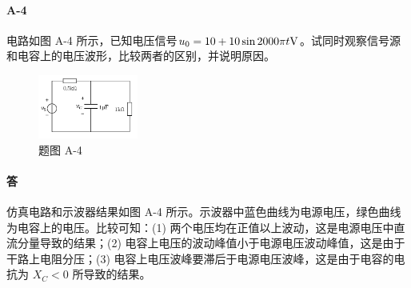 \documentclass[hyperref, UTF8]{ctexart}
\newcommand{\volt}{{\rm V}}
\begin{document}
\paragraph{A-4} 电路如图 A-4 所示，已知电压信号$u_0 = 10 + 10 \sin 2000 \pi t \volt $。试同时观察信号源和电容上的电压波形，比较两者的区别，并说明原因。

\begin{figure}[!htb]
\centering
\includegraphics[width=0.293\textwidth]{pA-4.png}
\caption*{题图 A-4}
\end{figure}

\paragraph{答} 仿真电路和示波器结果如图 A-4 所示。示波器中蓝色曲线为电源电压，绿色曲线为电容上的电压。比较可知：(1) 两个电压均在正值以上波动，这是电源电压中直流分量导致的结果；(2) 电容上电压的波动峰值小于电源电压波动峰值，这是由于干路上电阻分压；(3) 电容上电压波峰要滞后于电源电压波峰，这是由于电容的电抗为 $X_C<0$ 所导致的结果。
\end{document}
